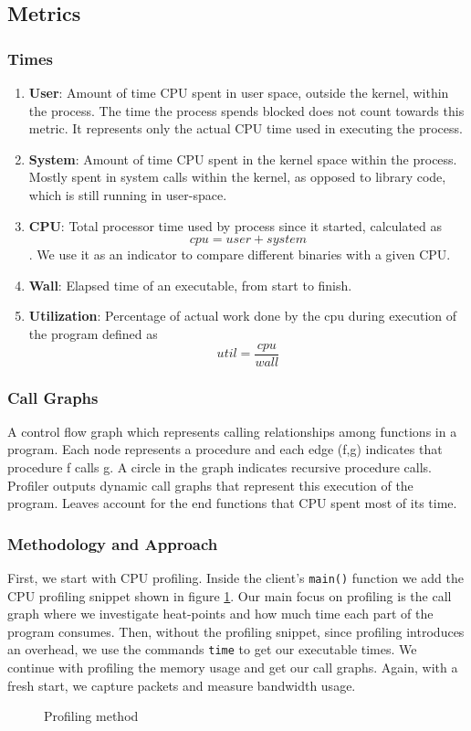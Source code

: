 \subsection{Metrics}
\subsubsection{Times}
\begin{enumerate}
    \item \textbf{User}: Amount of time CPU spent in user space, outside the kernel, within the process. The time the process spends blocked does not count towards this metric. It represents only the actual CPU time used in executing the process.
    \item \textbf{System}: Amount of time CPU spent in the kernel space within the process. Mostly spent in system calls within the kernel, as opposed to library code, which is still running in user-space.
    \item \textbf{CPU}: Total processor time used by process since it started, calculated as $$cpu=user+system$$. We use it as an indicator to compare different binaries with a given CPU.
    \item \textbf{Wall}: Elapsed time of an executable, from start to finish.
    \item \textbf{Utilization}: Percentage of actual work done by the cpu during execution of the program defined as $$util=\frac{cpu}{wall}$$  
\end{enumerate}
\subsubsection{Call Graphs}
A control flow graph which represents calling relationships among functions in a program. Each node represents a procedure and each edge (f,g) indicates that procedure f calls g. A circle in the graph indicates recursive procedure calls. Profiler outputs dynamic call graphs that represent this execution of the program. Leaves account for the end functions that CPU spent most of its time.

\subsubsection{Methodology and Approach}
First, we start with CPU profiling. Inside the client's \verb|main()| function we add the CPU profiling snippet shown in figure \ref{fig:Profiling}. Our main focus on profiling is the call graph where we investigate heat-points and how much time each part of the program consumes. Then, without the profiling snippet, since profiling introduces an overhead, we use the commands \verb|time| to get our executable times. We continue with profiling the memory usage and get our call graphs. Again, with a fresh start, we capture packets and measure bandwidth usage. 
\begin{figure}[ht]
    \centering
    
    \caption{Profiling method \cite{pprof}}
    \label{fig:Profiling}
\end{figure}
